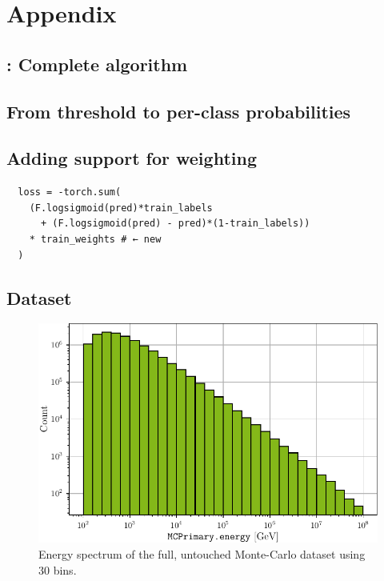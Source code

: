 \chapter{Appendix}
\blindtext

\section{\dseaplus{}: Complete algorithm} \label{sec:alg:dseaplus}



\section{From threshold to per-class probabilities}
\label{sec:appendix:corn_probas}
\blindtext


\section{Adding support for weighting}
\label{sec:appendix:corn_weighting}
\begin{verbatim}
  loss = -torch.sum(
    (F.logsigmoid(pred)*train_labels
      + (F.logsigmoid(pred) - pred)*(1-train_labels))
    * train_weights # ← new
  )
\end{verbatim}


\section{Dataset}
\begin{figure}
  \centering
  \includegraphics[scale=1]{content/plots/dataset:raw:histogram_full.pdf}
  \caption{Energy spectrum of the full, untouched Monte-Carlo dataset using 30 bins.}
  \label{fig:dataset:raw:histogram}
\end{figure}

